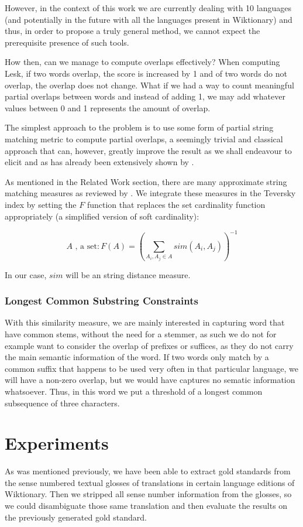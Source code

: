 \documentclass[10pt, a4paper]{article}
\begin{document}
However, in the context of this work we are currently dealing with 10 languages (and potentially in the future with all the languages present in Wiktionary) and thus, in order to propose a truly general method, we cannot expect the prerequisite presence of such tools. 

How then, can we manage to compute overlaps effectively? When computing Lesk, if two words overlap, the score is increased by 1 and of two words do not overlap, the overlap does not change. What if we had a way to count meaningful partial overlaps between words and instead of adding 1, we may add whatever values between 0 and 1 represents the amount of overlap.

The simplest approach to the problem is to use some form of partial string matching metric to compute partial overlaps, a seemingly trivial and classical approach that can, however, greatly improve the result as we shall endeavour to elicit and as has already been extensively shown by \cite{Jimenez2012}. 

As mentioned in the Related Work section, there are many approximate string matching measures as reviewed by \cite{Cohen2003}. We integrate these measures in the Teversky index by setting the \(F\) function that replaces the set cardinality function appropriately (a simplified version of soft cardinality):

\[
	A \mbox{ , a set} : F(A) = (\sum_{A_i,A_j \in A}sim(A_i, A_j))^{-1}
\]

In our case, \(sim\) will be an string distance measure.

\subsubsection{Longest Common Substring Constraints}
With this similarity measure, we are mainly interested in capturing word that have common stems, without the need for a stemmer, as such we do not for example want to consider the overlap of prefixes or suffices, as they do not carry the main semantic information of the word. If two words only match by a common suffix that happens to be used very often in that particular language, we will have a non-zero overlap, but we would have captures no sematic information whatsoever. Thus, in this word we put a threshold of a longest common subsequence of three characters.

\section{Experiments}
\label{sec:expe}
As was mentioned previously, we have been able to extract gold standards from the sense numbered textual glosses of translations in certain language editions of Wiktionary. Then we stripped all sense number information from the glosses, so we could disambiguate those same translation and then evaluate the results on the previously generated gold standard.
\end{document}
